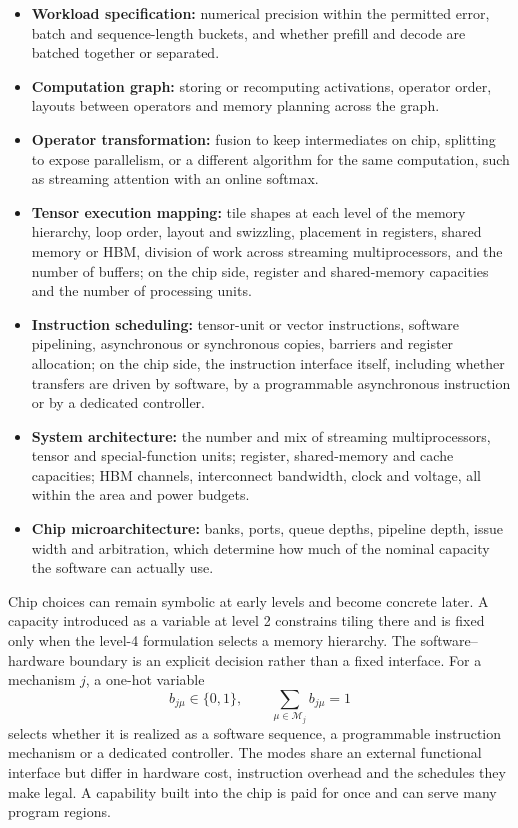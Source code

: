 \documentclass[11pt]{article}
\providecommand{\tightlist}{\setlength{\itemsep}{0pt}\setlength{\parskip}{0pt}}
\begin{document}
\begin{itemize}
\tightlist
\item
  \textbf{Workload specification:} numerical precision within the permitted error, batch and sequence-length buckets, and whether prefill and decode are batched together or separated.
\item
  \textbf{Computation graph:} storing or recomputing activations, operator order, layouts between operators and memory planning across the graph.
\item
  \textbf{Operator transformation:} fusion to keep intermediates on chip, splitting to expose parallelism, or a different algorithm for the same computation, such as streaming attention with an online softmax.
\item
  \textbf{Tensor execution mapping:} tile shapes at each level of the memory hierarchy, loop order, layout and swizzling, placement in registers, shared memory or HBM, division of work across streaming multiprocessors, and the number of buffers; on the chip side, register and shared-memory capacities and the number of processing units.
\item
  \textbf{Instruction scheduling:} tensor-unit or vector instructions, software pipelining, asynchronous or synchronous copies, barriers and register allocation; on the chip side, the instruction interface itself, including whether transfers are driven by software, by a programmable asynchronous instruction or by a dedicated controller.
\item
  \textbf{System architecture:} the number and mix of streaming multiprocessors, tensor and special-function units; register, shared-memory and cache capacities; HBM channels, interconnect bandwidth, clock and voltage, all within the area and power budgets.
\item
  \textbf{Chip microarchitecture:} banks, ports, queue depths, pipeline depth, issue width and arbitration, which determine how much of the nominal capacity the software can actually use.
\end{itemize}

Chip choices can remain symbolic at early levels and become concrete later. A capacity introduced as a variable at level 2 constrains tiling there and is fixed only when the level-4 formulation selects a memory hierarchy. The software--hardware boundary is an explicit decision rather than a fixed interface. For a mechanism \(j\), a one-hot variable
\[
b_{j\mu}\in\{0,1\},\qquad \sum_{\mu\in\mathcal M_j}b_{j\mu}=1
\]
selects whether it is realized as a software sequence, a programmable instruction mechanism or a dedicated controller. The modes share an external functional interface but differ in hardware cost, instruction overhead and the schedules they make legal. A capability built into the chip is paid for once and can serve many program regions.
\end{document}
